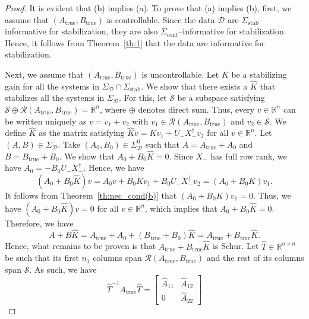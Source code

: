 \documentclass[9pt,shortpaper,twoside,web]{ieeecolor}
\begin{document}
\begin{proof} 
It is evident that (b) implies (a). To prove that (a) implies (b), first, we assume that $(A_\text{true},B_\text{true})$ is controllable. Since the data $\mathcal{D}$ are $\Sigma_\text{stab}$--informative for stabilization, they are also \mbox{$\Sigma_\text{cont}$--informative} for stabilization. Hence, it follows from Theorem~\ref{th:1} that the data are informative for stabilization. 

Next, we assume that $(A_\text{true},B_\text{true})$ is uncontrollable. Let $K$ be a stabilizing gain for all the systems in $\Sigma_\mathcal{D} \cap \Sigma_\text{stab}$. We show that there exists a $\hat{K}$ that stabilizes all the systems in $\Sigma_\mathcal{D}$. For this, let $\mathcal{S}$ be a subspace satisfying \mbox{$\mathcal{S}\oplus \mathcal{R}(A_\text{true},B_\text{true}) =\mathbb{R}^n $}, where $\oplus$ denotes direct sum. Thus, every $v\in\mathbb{R}^n$ can be written uniquely as \mbox{$v=v_1+v_2$} with $v_1\in\mathcal{R}(A_\text{true},B_\text{true})$ and $v_2\in\mathcal{S}$. We define $\hat{K}$ as the matrix satisfying $\hat{K}v=Kv_1+U_-X_-^\dagger v_2$ for all $v\in\mathbb{R}^n$. Let $(A,B)\in\Sigma_\mathcal{D}$. Take $(A_0,B_0)\in\Sigma_\mathcal{D}^0$ such that $A=A_\text{true}+A_0$ and $B=B_\text{true}+B_0$.  We show that $A_0 + B_0\hat{K}=0$. Since $X_-$ has full row rank, we have $A_0 = -B_0 U_- X_-^\dagger$. Hence, we have
\begin{equation}
(A_0 + B_0\hat{K}) v = A_0 v + B_0 K v_1 + B_0 U_- X_-^\dagger v_2 = (A_0 + B_0 K) v_1.
\end{equation}
It follows from Theorem~\ref{th:nec_cond(b)} that $(A_0 + B_0 K) v_1=0$. Thus, we have $(A_0 + B_0\hat{K}) v=0$ for all $v\in\mathbb{R}^n$, which implies that \mbox{$A_0 + B_0\hat{K}=0$}. Therefore, we have
\begin{equation}
\label{eq:nontrue=true}
A+B\hat{K}=A_\text{true}+A_0+(B_\text{true}+B_0)\hat{K}=A_\text{true}+B_\text{true}\hat{K}.
\end{equation}
Hence, what remains to be proven is that $A_\text{true}+B_\text{true}\hat{K}$ is Schur. Let $\hat{T}\in\mathbb{R}^{n\times n}$ be such that its first $n_1$ columns span $\mathcal{R}(A_\text{true},B_\text{true})$ and the rest of its columns span $\mathcal{S}$. As such, we have
\begin{equation}
\label{eq:Kalman_decomp_T}
\hat{T}^{-1}A_\text{true}\hat{T}=\begin{bmatrix}
\hat{A}_{11} & \hat{A}_{12} \\
0      & \hat{A}_{22}

\end{bmatrix}
\end{equation}
\end{proof}
\end{document}
